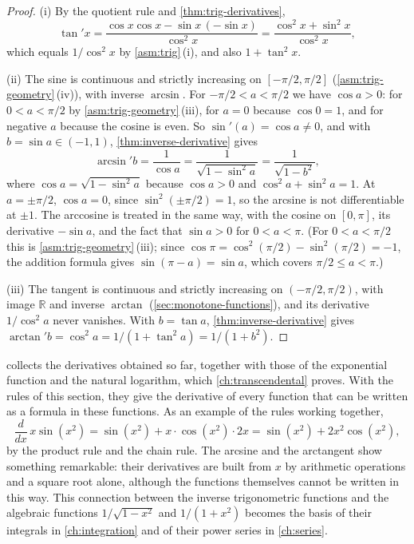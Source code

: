 \begin{proof}
(i) By the quotient rule and \cref{thm:trig-derivatives},
\[
\tan'x=\frac{\cos x\cos x-\sin x\,(-\sin x)}{\cos^2x}=\frac{\cos^2x+\sin^2x}{\cos^2x},
\]
which equals $1/\cos^2x$ by \cref{asm:trig}\,(i), and also $1+\tan^2x$.

(ii) The sine is continuous and strictly increasing on $[-\pi/2,\pi/2]$ (\cref{asm:trig-geometry}\,(iv)), with inverse $\arcsin$. For $-\pi/2<a<\pi/2$ we have $\cos a>0$: for $0<a<\pi/2$ by \cref{asm:trig-geometry}\,(iii), for $a=0$ because $\cos0=1$, and for negative $a$ because the cosine is even. So $\sin'(a)=\cos a\ne0$, and with $b=\sin a\in(-1,1)$, \cref{thm:inverse-derivative} gives
\[
\arcsin'b=\frac1{\cos a}=\frac1{\sqrt{1-\sin^2a}}=\frac1{\sqrt{1-b^2}},
\]
where $\cos a=\sqrt{1-\sin^2a}$ because $\cos a>0$ and $\cos^2a+\sin^2a=1$. At $a=\pm\pi/2$, $\cos a=0$, since $\sin^2(\pm\pi/2)=1$, so the arcsine is not differentiable at $\pm1$. The arccosine is treated in the same way, with the cosine on $[0,\pi]$, its derivative $-\sin a$, and the fact that $\sin a>0$ for $0<a<\pi$. (For $0<a<\pi/2$ this is \cref{asm:trig-geometry}\,(iii); since $\cos\pi=\cos^2(\pi/2)-\sin^2(\pi/2)=-1$, the addition formula gives $\sin(\pi-a)=\sin a$, which covers $\pi/2\le a<\pi$.)

(iii) The tangent is continuous and strictly increasing on $(-\pi/2,\pi/2)$, with image $\mathbb R$ and inverse $\arctan$ (\cref{sec:monotone-functions}), and its derivative $1/\cos^2a$ never vanishes. With $b=\tan a$, \cref{thm:inverse-derivative} gives $\arctan'b=\cos^2a=1/(1+\tan^2a)=1/(1+b^2)$.
\end{proof}

 collects the derivatives obtained so far, together with those of the exponential function and the natural logarithm, which \cref{ch:transcendental} proves. With the rules of this section, they give the derivative of every function that can be written as a formula in these functions. As an example of the rules working together,
\[
\frac d{dx}\,x\sin(x^2)=\sin(x^2)+x\cdot\cos(x^2)\cdot2x=\sin(x^2)+2x^2\cos(x^2),
\]
by the product rule and the chain rule. The arcsine and the arctangent show something remarkable: their derivatives are built from $x$ by arithmetic operations and a square root alone, although the functions themselves cannot be written in this way. This connection between the inverse trigonometric functions and the algebraic functions $1/\sqrt{1-x^2}$ and $1/(1+x^2)$ becomes the basis of their integrals in \cref{ch:integration} and of their power series in \cref{ch:series}.

